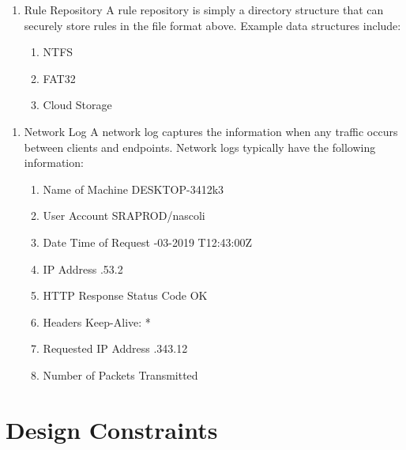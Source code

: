\documentclass{scrreprt}
\begin{document}
\begin{enumerate}[label*=D\arabic*.]
    \item Rule Repository
	\subitem A rule repository is simply a directory structure that can securely store rules in the file format above. Example data structures include: 
    \begin{enumerate}[label*=\arabic*.]
	\item NTFS
	\item FAT32
	\item Cloud Storage
\end{enumerate}
\end{enumerate}

\begin{enumerate}[label*=D\arabic*.]
    \item Network Log
	\subitem A network log captures the information when any traffic occurs between clients and endpoints. Network logs typically have the following information:
    \begin{enumerate}[label*=\arabic*.]
	\item Name of Machine
		\subitem DESKTOP-3412k3
	\item User Account
		\subitem SRAPROD/nascoli
	\item Date Time of Request
		-03-2019 T12:43:00Z
	\item IP Address
		.53.2
	\item HTTP Response Status Code
		 OK
	\item Headers
		\subitem Keep-Alive: *
	\item Requested IP Address
		.343.12
	\item Number of Packets Transmitted

\end{enumerate}
\end{enumerate}

\section{Design Constraints}
\end{document}
